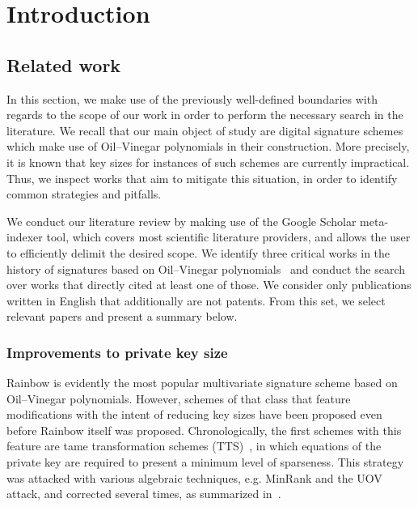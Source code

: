 \documentclass[12pt, a4paper, oneside]{memoir}
\theoremstyle{definition}
\begin{document}
\tableofcontents*

\chapter{Introduction}\label{chapter:intro}


\section{Related work}\label{sec:related}

In this section, we make use of the previously well-defined boundaries with regards to the scope of our work in order to perform the necessary search in the literature. We recall that our main object of study are digital signature schemes which make use of Oil--Vinegar polynomials in their construction. More precisely, it is known that key sizes for instances of such schemes are currently impractical. Thus, we inspect works that aim to mitigate this situation, in order to identify common strategies and pitfalls.

We conduct our literature review by making use of the Google Scholar meta-indexer tool, which covers most scientific literature providers, and allows the user to efficiently delimit the desired scope. We identify three critical works in the history of signatures based on Oil--Vinegar polynomials~\cite{Patarin:199709,Kipnis:199904,Ding:200506} and conduct the search over works that directly cited at least one of those. We consider only publications written in English that additionally are not patents. From this set, we select relevant papers and present a summary below.

\subsection{Improvements to private key size}\label{subsec:priv}

Rainbow is evidently the most popular multivariate signature scheme based on Oil--Vinegar polynomials. However, schemes of that class that feature modifications with the intent of reducing key sizes have been proposed even before Rainbow itself was proposed. Chronologically, the first schemes with this feature are tame transformation schemes (TTS)~\cite{Chen:200210}, in which equations of the private key are required to present a minimum level of sparseness. This strategy was attacked with various algebraic techniques, e.g. MinRank and the UOV attack, and corrected several times, as summarized in~\cite{Ding:200604}.
\end{document}
